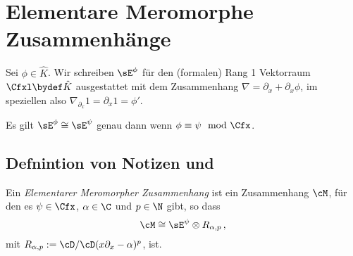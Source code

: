 \chapter{Elementare Meromorphe Zusammenhänge}
\begin{comment}
einführen als Bausteine oder kleinste Meromorphe Zusammenhänge
\end{comment}
\begin{defn}
\cite[1.a]{sabbah_Fourier-local}
Sei $\phi\in\hat K$.
Wir schreiben $\sE^\phi$ für den (formalen) Rang 1 Vektorraum $\Cfxl \bydef
\hat K$ ausgestattet mit dem Zusammenhang $\nabla=\partial_x+\partial_x\phi$,
im speziellen also $\nabla_{\partial_x}1=\partial_x1=\phi'$.\\
\begin{comment}
Also
\begin{align*}
\sE^\phi=\Cfxl & \overset{\partial_x}{\rightarrow} \Cfxl\\
1              & \mapsto \phi'(x)\\
f(x)           & \mapsto f'(x)+f(x)\phi'(x)\\
\end{align*}
\end{comment}
\end{defn}

\begin{bem} \label{bem:FormRang1VR}
\cite[1.a]{sabbah_Fourier-local}
Es gilt $\sE^\phi\cong\sE^\psi$ genau dann wenn $\phi\equiv\psi \mod \Cfx$.
\end{bem}
%

\section{Defnintion von Notizen und \cite[Cor 5.2.6]{sabbah_cimpa90}}
\begin{defn}
Ein \emph{Elementarer Meromorpher Zusammenhang} ist ein Zusammenhang $\cM$, für
den es $\psi \in \Cfx$, $\alpha\in\C$ und $p\in \N$ gibt, so dass
\[
\cM\cong \sE^{\psi}\otimes R_{\alpha,p}\,,
\]
mit $R_{\alpha,p}:=\cD/\cD(x\partial_x-\alpha)^p$, ist.
\begin{comment}
Sind die Regulär?
\end{comment}
\end{defn}

